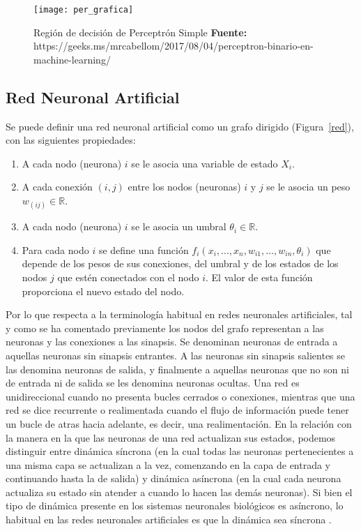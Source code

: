 \documentclass[10pt,a4paper]{article}
\begin{document}
\begin{figure}[H]
\centering
\texttt{[image: per\_grafica]}
\caption{Región de decisión de Perceptrón Simple {\scriptsize \textbf{Fuente: }https://geeks.ms/mrcabellom/2017/08/04/perceptron-binario-en-machine-learning/}}
\label{grafica}
\end{figure}

\subsection{Red Neuronal Artificial}
Se puede definir una red neuronal artificial como un grafo dirigido (Figura~\ref{red}), con las siguientes propiedades:
\begin{enumerate}
\item A cada nodo (neurona) $i$ se le asocia una variable de estado $X_i$.
\item A cada conexión $(i, j)$ entre los nodos (neuronas) $i$ y $j$ se le asocia un peso $w_(ij) \in \mathbb{R}$.
\item A cada nodo (neurona) $i$ se le asocia un umbral $\theta_i \in \mathbb{R}$.
\item Para cada nodo $i$ se define una función $f_i(x_i,...,x_n,w_{i1},...,w_{in},\theta_i)$ que depende de los pesos de sus conexiones, del umbral y de los estados de los nodos $j$ que estén conectados con el nodo $i$. El valor de esta función proporciona el nuevo estado del nodo.

\end{enumerate}

Por lo que respecta a la terminología habitual en redes neuronales artificiales,
tal y como se ha comentado previamente los nodos del grafo representan a las
neuronas y las conexiones a las sinapsis. Se denominan neuronas de entrada a
aquellas neuronas sin sinapsis entrantes. A las neuronas sin sinapsis salientes
se las denomina neuronas de salida, y finalmente a aquellas neuronas que no
son ni de entrada ni de salida se les denomina neuronas ocultas. Una red es
unidireccional cuando no presenta bucles cerrados o conexiones, mientras que una
red se dice recurrente o realimentada cuando el flujo de información puede tener
un bucle de atras hacia adelante, es decir, una realimentación. En la relación con
la manera en la que las neuronas de una red actualizan sus estados, podemos
distinguir entre dinámica síncrona (en la cual todas las neuronas pertenecientes
a una misma capa se actualizan a la vez, comenzando en la capa de entrada y
continuando hasta la de salida) y dinámica asíncrona (en la cual cada neurona
actualiza su estado sin atender a cuando lo hacen las demás neuronas). Si bien
el tipo de dinámica presente en los sistemas neuronales biológicos es asíncrono,
lo habitual en las redes neuronales artificiales es que la dinámica sea síncrona \cite{Larranaga}.
\end{document}
